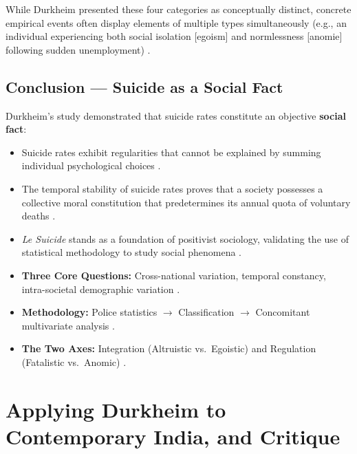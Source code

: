 \begin{CriticalPoint}
While Durkheim presented these four categories as conceptually distinct, concrete empirical events often display elements of multiple types simultaneously (e.g., an individual experiencing both social isolation [egoism] and normlessness [anomie] following sudden unemployment) .
\end{CriticalPoint}

\subsection{Conclusion --- Suicide as a Social Fact}

Durkheim's study demonstrated that suicide rates constitute an objective \textbf{social fact}:
\begin{itemize}
    \item Suicide rates exhibit regularities that cannot be explained by summing individual psychological choices .
    \item The temporal stability of suicide rates proves that a society possesses a collective moral constitution that predetermines its annual quota of voluntary deaths .
    \item \textit{Le Suicide} stands as a foundation of positivist sociology, validating the use of statistical methodology to study social phenomena .
\end{itemize}

\begin{QuickRevision}
\begin{itemize}
    \item \textbf{Three Core Questions:} Cross-national variation, temporal constancy, intra-societal demographic variation .
    \item \textbf{Methodology:} Police statistics $\rightarrow$ Classification $\rightarrow$ Concomitant multivariate analysis .
    \item \textbf{The Two Axes:} Integration (Altruistic vs.\ Egoistic) and Regulation (Fatalistic vs.\ Anomic) .
\end{itemize}
\end{QuickRevision}

\sectiondivider

\section{Applying Durkheim to Contemporary India, and Critique}


